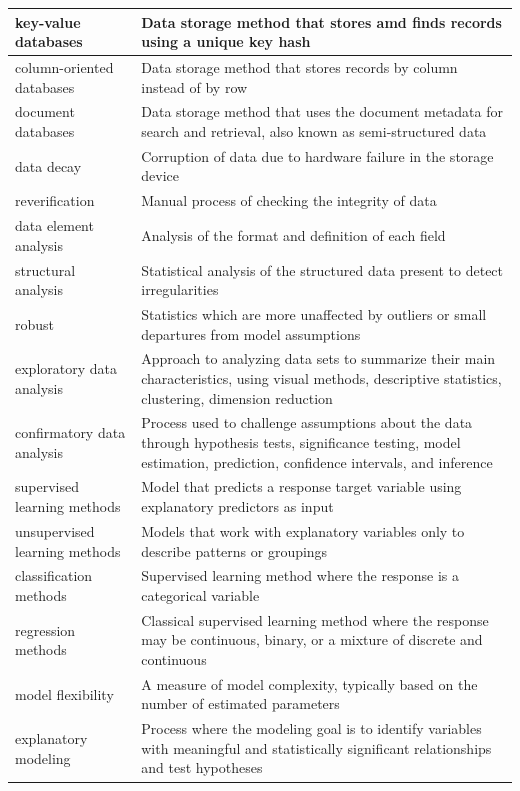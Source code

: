 \documentclass[
]{book}
\begin{document}
\begin{longtable}{>{\raggedright\arraybackslash}p{10em}|>{\raggedright\arraybackslash}p{30em}}
\hline
key-value databases & Data storage method that stores amd finds records using a unique key hash\\
\hline
column-oriented databases & Data storage method that stores records by column instead of by row\\
\hline
document databases & Data storage method that uses the document metadata for search and retrieval, also known as semi-structured data\\
\hline
data decay & Corruption of data due to hardware failure in the storage device\\
\hline
reverification & Manual process of checking the integrity of data\\
\hline
data element analysis & Analysis of the format and definition of each field\\
\hline
structural analysis & Statistical analysis of the structured data present to detect irregularities\\
\hline
robust & Statistics which are more unaffected by outliers or small departures from model assumptions\\
\hline
exploratory data analysis & Approach to analyzing data sets to summarize their main characteristics, using visual methods, descriptive statistics, clustering, dimension reduction\\
\hline
confirmatory data analysis & Process used to challenge assumptions about the data through hypothesis tests, significance testing, model estimation, prediction, confidence intervals, and inference\\
\hline
supervised learning methods & Model that predicts a response target variable using explanatory predictors as input\\
\hline
unsupervised learning methods & Models that work with explanatory variables only to describe patterns or groupings\\
\hline
classification methods & Supervised learning method where the response is a categorical variable\\
\hline
regression methods & Classical supervised learning method where the response may be continuous, binary, or a mixture of discrete and continuous\\
\hline
model flexibility & A measure of model complexity, typically based on the number of estimated parameters\\
\hline
explanatory modeling & Process where the modeling goal is to identify variables with meaningful and statistically significant relationships and test hypotheses\\

\end{longtable}
\end{document}
